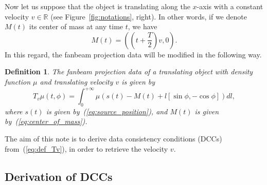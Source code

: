 \documentclass[a4paper]{article}
\numberwithin{equation}{section}
\newcommand{\R}{\mathbb{R}}
\newtheorem{definition}{Definition}
\begin{document}
Now let us suppose that the object is translating along the $x$-axis with a constant velocity $v \in \R$ (see Figure~\ref{fig:notations}, right). In other words, if we denote $M(t)$ its center of mass at any time $t$, we have
\begin{equation}
	M(t) =  \left( \left( t + \frac{T}{2} \right)v, 0 \right).
\label{eq:center_of_mass}
\end{equation}
In this regard, the fanbeam projection data will be modified in the following way.
\begin{definition}
The \emph{fanbeam projection data of a translating object} with density function $\mu$ and translating velocity $v$ is given by
\begin{equation}
	T_v\mu(t,\phi) = \int_0^{+\infty} \mu \left( s(t) - M(t) + l \left[ \sin \phi, -\cos \phi \right] \right) dl,
\label{eq:def_Tv}
\end{equation}
where $s(t)$ is given by~(\ref{eq:source_position}), and $M(t)$ is given by~(\ref{eq:center_of_mass}).
\end{definition}

The aim of this note is to derive data consistency conditions (DCCs) from~(\ref{eq:def_Tv}), in order to retrieve the velocity $v$.

\subsection{Derivation of DCCs}
\end{document}
